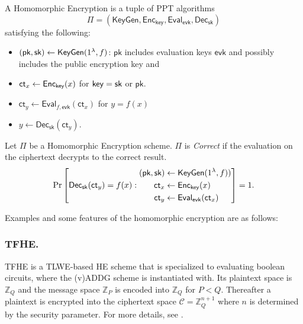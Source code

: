 \documentclass[runningheads]{llncs}
\newcommand{\bb}[1]{\mathbb{#1}}  %
\newcommand{\cc}[1]{\mathcal{#1}} %
\newcommand{\ct}{\textsf{ct}{}}
\newcommand{\sk}{\textsf{sk}{}}
\newcommand{\evk}{\textsf{evk}}
\newcommand{\pk}{\textsf{pk}{}}
\newcommand{\eval}{\textsf{Eval}}
\newcommand{\dec}{\textsf{Dec}}
\newcommand{\enc}{\textsf{Enc}}
\begin{document}
    \begin{definition}
            A Homomorphic Encryption is a tuple of PPT algorithms 
            \[
            \Pi = (\mathsf{KeyGen, Enc_{key},Eval_{evk},Dec_{sk}})
            \]
            satisfying the following:
            \begin{itemize}
                \item $(\pk,\sk)\gets {\sf KeyGen}(1^\lambda,f)$: $\pk$ includes evaluation keys $\evk$ and possibly includes the public encryption key and 
                \item $\ct_x\gets {\sf Enc_{key}}(x)$ for ${\sf key}=\sk$ or $\pk$.
                \item $\ct_y\gets\eval_{f,\evk}(\ct_x)$ for $y=f(x)$
                \item $y\gets\dec_{\sk}(\ct_y).$
            \end{itemize}
    \end{definition}
    \begin{definition}[Correcteness]\label{def:HE_correctness}
        Let $\Pi$ be a Homomorphic Encryption scheme. $\Pi$ is \emph{Correct} if the evaluation on the ciphertext decrypts to the correct result.
        \[\Pr\left[\dec_{\sf sk}(\ct_y)=f(x):                    \begin{aligned}
                    (\pk, \sk) &\gets \mathsf{KeyGen}(1^\lambda,f))\\
                    \ct_x &\gets \enc_{\mathsf{key}}(x)\\
                    \ct_y &\gets \eval_{\evk}(\ct_x)
                \end{aligned}\right]=1.\]
    \end{definition}
    Examples and some features of the homomorphic encryption are as follows:

    \subsubsection{TFHE.}
    TFHE is a TLWE-based HE scheme that is specialized to evaluating boolean circuits\cite{CGGI}, where the (v)ADDG scheme is instantiated with.
    Its plaintext space is $\bb Z_Q$ and the message space $\bb Z_P$ is encoded into $\bb Z_Q$ for $P<Q$. Thereafter a plaintext is encrypted into the ciphertext space $\cc C=\bb Z_Q^{n+1}$ where $n$ is determined by the security parameter. For more details, see \cite{Joy21}.
    
\end{document}
